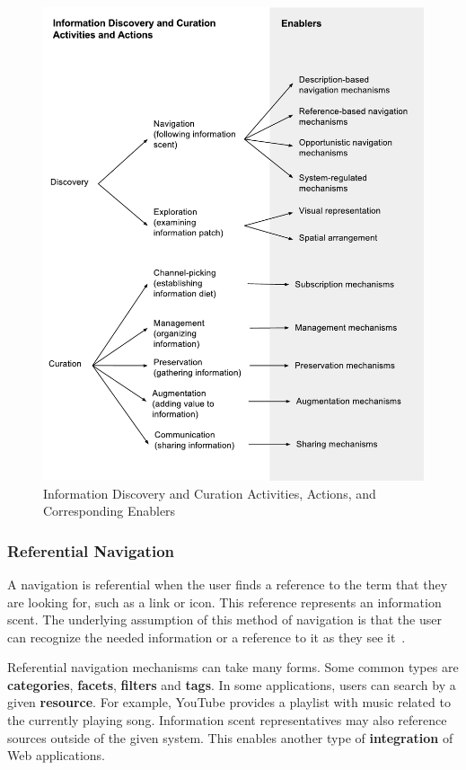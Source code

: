 \documentclass{sigchi}
\begin{document}
{{{\begin{figure}[ht!]
	\noindent
	\centering
    \includegraphics[width=\linewidth]{figures/framework_enablers.pdf}
	\caption{Information Discovery and Curation Activities, Actions, and Corresponding Enablers}
	\label{fig:enablers} 
\end{figure}


{\subsubsection{Referential Navigation}
A navigation is referential when the user finds a reference to the term that they are looking for, such as a link or icon. This reference represents an information scent. The underlying assumption of this method of navigation is that the user can recognize the needed information or a reference to it as they see it~\cite{waterworth1991model}. 

Referential navigation mechanisms can take many forms. Some common types are \textbf{categories}, \textbf{facets}, \textbf{filters} and \textbf{tags}. In some applications, users can search by a given \textbf{resource}. For example, YouTube provides a playlist with music related to the currently playing song. Information scent representatives may also reference sources outside of the given system. This enables another type of \textbf{integration} of Web applications. 

}}}}
\end{document}
